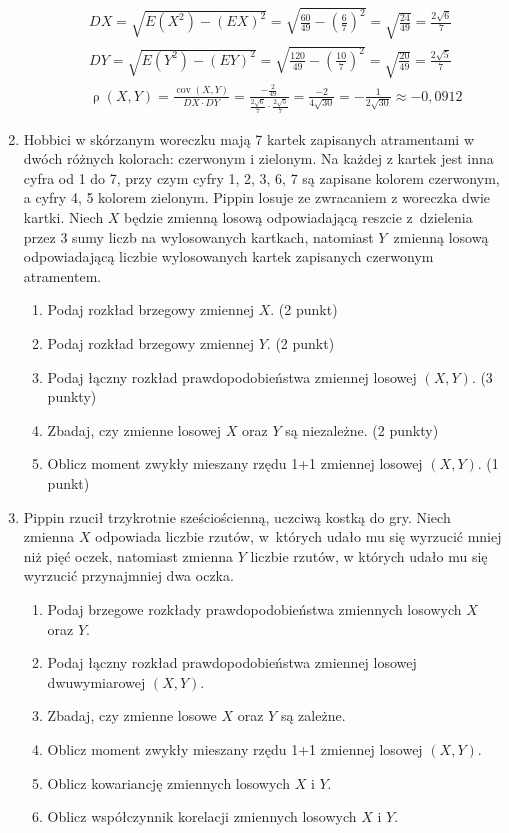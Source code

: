 \documentclass[twoside]{mwart}
\newenvironment{ansenv}{\comment}{\endcomment}
\newenvironment{ansenv}{\paragraph{Odpowiedź:}}{}
\DeclareMathOperator{\cov}{cov}
\DeclareMathOperator{\corr}{\rho}
\begin{document}
\begin{enumerate}
\begin{enumerate}
\begin{ansenv}
\begin{gather*}
	DX = \sqrt{E(X^2)-(EX)^2} = \sqrt{\frac{60}{49}-\left(\frac{6}{7}\right)^2} = \sqrt{\frac{24}{49}} = \frac{2\sqrt{6}}{7} \\
	DY = \sqrt{E(Y^2)-(EY)^2} = \sqrt{\frac{120}{49}-\left(\frac{10}{7}\right)^2} = \sqrt{\frac{20}{49}} = \frac{2\sqrt{5}}{7} \\
	\corr(X,Y)=\frac{\cov(X,Y)}{DX\cdot DY} = \frac{-\frac{2}{49}}{\frac{2\sqrt{6}}{7}\cdot \frac{2\sqrt{5}}{7}} = \frac{-2}{4\sqrt{30}} = -\frac{1}{2\sqrt{30}} \approx -0{,}0912
	\end{gather*}
\end{ansenv}
\end{enumerate}

\item Hobbici w skórzanym woreczku mają 7 kartek zapisanych atramentami w dwóch różnych kolorach: czerwonym i zielonym.
Na każdej z kartek jest inna cyfra od 1 do 7, przy czym cyfry 1, 2, 3, 6, 7 są zapisane kolorem czerwonym, a cyfry 4, 5 kolorem zielonym.
Pippin losuje ze zwracaniem z woreczka dwie kartki.
Niech $X$ będzie zmienną losową odpowiadającą reszcie z~dzielenia przez 3 sumy liczb na wylosowanych kartkach, natomiast $Y$~zmienną losową odpowiadającą liczbie wylosowanych kartek zapisanych czerwonym atramentem.

\begin{enumerate}
\item Podaj rozkład brzegowy zmiennej $X$. (2 punkt)
\item Podaj rozkład brzegowy zmiennej $Y$. (2 punkt)
\item Podaj łączny rozkład prawdopodobieństwa zmiennej losowej $(X,Y)$. (3 punkty)
\item Zbadaj, czy zmienne losowej $X$ oraz $Y$ są niezależne. (2 punkty)
\item Oblicz moment zwykły mieszany rzędu 1+1 zmiennej losowej $(X,Y)$. (1 punkt)
\end{enumerate}

\item Pippin rzucił trzykrotnie sześciościenną, uczciwą kostką do gry. Niech zmienna $X$ odpowiada liczbie rzutów, w~których udało mu się wyrzucić mniej niż pięć
oczek, natomiast zmienna $Y$ liczbie rzutów, w których udało mu się wyrzucić przynajmniej dwa oczka.
\begin{enumerate}
\item Podaj brzegowe rozkłady prawdopodobieństwa zmiennych losowych $X$ oraz $Y$.
\item Podaj łączny rozkład prawdopodobieństwa zmiennej losowej dwuwymiarowej $(X,Y)$.
\item Zbadaj, czy zmienne losowe $X$ oraz $Y$ są zależne.
\item Oblicz moment zwykły mieszany rzędu 1+1 zmiennej losowej $(X,Y)$.
\item Oblicz kowariancję zmiennych losowych $X$ i $Y$.
\item Oblicz współczynnik korelacji zmiennych losowych $X$ i $Y$.
\end{enumerate}


\end{enumerate}
\end{document}
